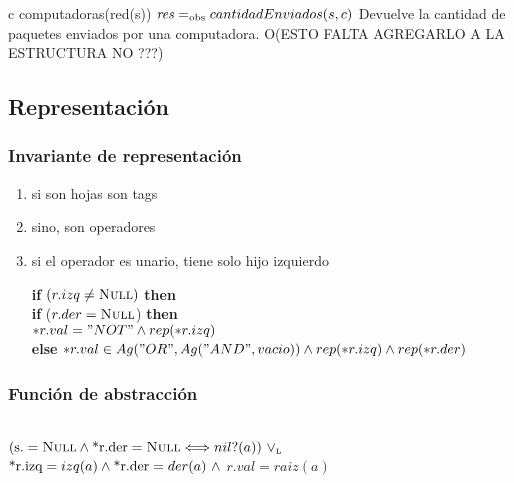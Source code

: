  {c \in computadoras(red(s))}
 {$\text{\textit{res}} =_{\mathrm{obs}} cantidadEnviados(s,c)$}
 {Devuelve la cantidad de paquetes enviados por una computadora.}
 {O(ESTO FALTA AGREGARLO A LA ESTRUCTURA NO ???)}

\subsection{Representación}


\subsubsection*{Invariante de representación}

\begin{enumerate}
	\item si son hojas son tags
	\item sino, son operadores
	\item si el operador es unario, tiene solo hijo izquierdo

		 \textbf{if} $(r.izq \neq \textsc{Null})$ \textbf{then} \\
		\textbf{if} ($r.der = \textsc{Null}$) \textbf{then} \\
		$*r.val = "NOT" \land rep(*r.izq)$ \\
		\textbf{else} $*r.val \in Ag("OR", Ag("AND",vacio)) \land rep(*r.izq) \land rep(*r.der)$
		\end{enumerate}

\subsubsection*{Función de abstracción}

  \\
 $(\text{\normalfont s.} = \textsc{Null} \land \text{\normalfont*r.der} = \textsc{Null} \Longleftrightarrow nil?(a)) \ \lor_{\mathrm{\scriptscriptstyle{L}}}$ \\
 $\text{\normalfont*r.izq} = izq(a) \land \text{\normalfont*r.der} = der(a) \ \land$
$r.val = raiz(a) $


